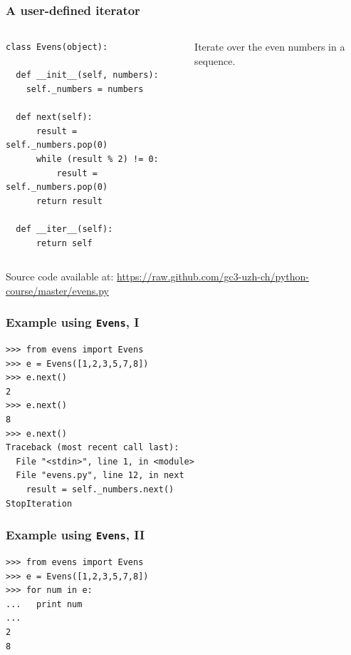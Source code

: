 \documentclass[english,serif,mathserif,xcolor=pdftex,dvipsnames,table]{beamer}
\begin{document}
\begin{frame}[fragile]
  \frametitle{A user-defined iterator}
  \begin{columns}[t]
    \begin{column}{0.5\textwidth}
\begin{lstlisting}
class Evens(object):

  def __init__(self, numbers):
    self._numbers = numbers

  def next(self):
      result = self._numbers.pop(0)
      while (result % 2) != 0:
          result = self._numbers.pop(0)
      return result

  def __iter__(self):
      return self
\end{lstlisting}
    \end{column}
    \begin{column}{0.5\textwidth}
      \raggedleft
      Iterate over the even numbers in a sequence.
    \end{column}
  \end{columns}

  \+
  {\scriptsize Source code available at:
    \url{https://raw.github.com/gc3-uzh-ch/python-course/master/evens.py}}
\end{frame}


\begin{frame}[fragile]
  \frametitle{Example using \texttt{Evens}, I}
\begin{lstlisting}
>>> from evens import Evens
>>> e = Evens([1,2,3,5,7,8])
>>> e.next()
2
>>> e.next()
8
>>> e.next()
Traceback (most recent call last):
  File "<stdin>", line 1, in <module>
  File "evens.py", line 12, in next
    result = self._numbers.next()
StopIteration
\end{lstlisting}
\end{frame}


\begin{frame}[fragile]
  \frametitle{Example using \texttt{Evens}, II}
\begin{lstlisting}
>>> from evens import Evens
>>> e = Evens([1,2,3,5,7,8])
>>> for num in e:
...   print num
...
2
8
\end{lstlisting}
\end{frame}
\end{document}
